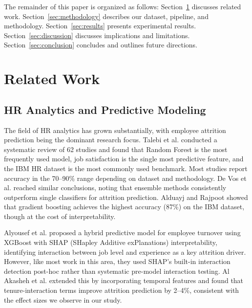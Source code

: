 \documentclass[conference]{IEEEtran}
\begin{document}
The remainder of this paper is organized as follows: Section~\ref{sec:related} discusses related work. Section~\ref{sec:methodology} describes our dataset, pipeline, and methodology. Section~\ref{sec:results} presents experimental results. Section~\ref{sec:discussion} discusses implications and limitations. Section~\ref{sec:conclusion} concludes and outlines future directions.

\section{Related Work}
\label{sec:related}

\subsection{HR Analytics and Predictive Modeling}

The field of HR analytics has grown substantially, with employee attrition prediction being the dominant research focus. Talebi et al. \cite{talebi2025systematic} conducted a systematic review of 62 studies and found that Random Forest is the most frequently used model, job satisfaction is the single most predictive feature, and the IBM HR dataset \cite{ibmhr} is the most commonly used benchmark. Most studies report accuracy in the 70--90\% range depending on dataset and methodology. De Vos et al. \cite{devos2024predicting} reached similar conclusions, noting that ensemble methods consistently outperform single classifiers for attrition prediction. Alduayj and Rajpoot \cite{alduayj2020predicting} showed that gradient boosting achieves the highest accuracy (87\%) on the IBM dataset, though at the cost of interpretability.

Alyousef et al. \cite{alyousef2026hybrid} proposed a hybrid predictive model for employee turnover using XGBoost with SHAP (SHapley Additive exPlanations) interpretability, identifying interaction between job level and experience as a key attrition driver. However, like most work in this area, they used SHAP's built-in interaction detection post-hoc rather than systematic pre-model interaction testing. Al Akasheh et al. \cite{alakasheh2023decade} extended this by incorporating temporal features and found that tenure-interaction terms improve attrition prediction by 2--4\%, consistent with the effect sizes we observe in our study.
\end{document}
